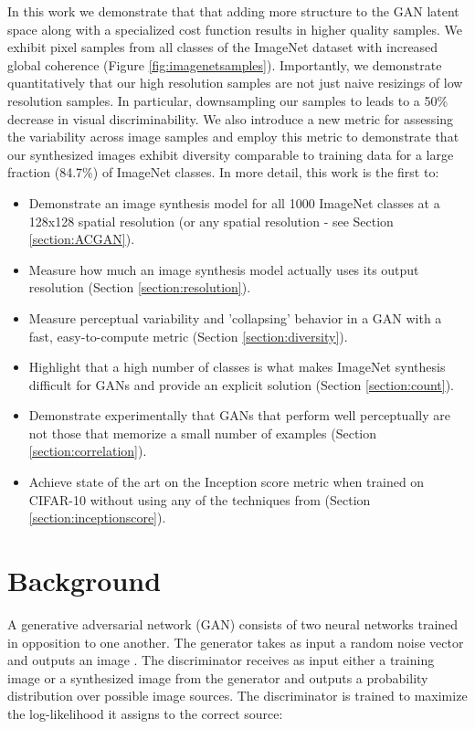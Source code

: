 \documentclass{article}
\begin{document}
In this work we demonstrate that that adding more structure to the GAN latent space
along with a specialized cost function results in higher quality samples.
We exhibit  pixel samples from all classes of the ImageNet dataset \citep{IMAGENET} with increased global coherence (Figure \ref{fig:imagenetsamples}).
Importantly, we demonstrate quantitatively that our high resolution
samples are not just naive resizings of low resolution samples.
In particular, downsampling our  samples
to  leads to a 50\% decrease in visual discriminability.
We also introduce
a new metric for assessing the variability across image samples and employ this
metric to demonstrate that our synthesized images exhibit diversity comparable to
training data for a large fraction (84.7\%) of ImageNet classes.
In more detail, this work is the first to:

\begin{itemize}
\item Demonstrate an image synthesis model for all 1000 ImageNet classes at a 128x128 spatial resolution (or any spatial resolution - see Section \ref{section:ACGAN}).
\item Measure how much an image synthesis model actually uses its output resolution (Section \ref{section:resolution}).
\item Measure perceptual variability and 'collapsing' behavior in a GAN with a fast, easy-to-compute metric (Section \ref{section:diversity}).
\item Highlight that a high number of classes is what makes ImageNet synthesis difficult for GANs and provide an explicit solution (Section \ref{section:count}).
\item Demonstrate experimentally that GANs that perform well perceptually are not those that memorize a small number of examples (Section \ref{section:correlation}).
\item Achieve state of the art on the Inception score metric when trained on CIFAR-10 without using any of the techniques from \cite{IMPROVEDTECHNIQUES} (Section \ref{section:inceptionscore}).
\end{itemize}


\section{Background}

A generative adversarial network (GAN) consists of two neural networks trained in opposition to one another.
The generator  takes as input a random noise vector  and outputs an image .
The discriminator  receives as input either a training image or a synthesized
image from the generator and outputs a probability distribution  over possible image sources.
The discriminator is trained to maximize the log-likelihood
it assigns to the correct source:
\end{document}

